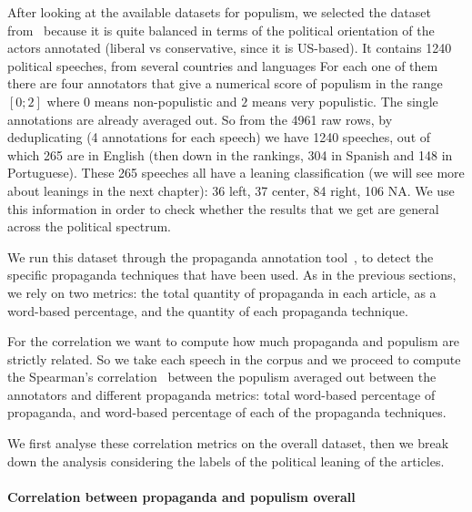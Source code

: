 After looking at the available datasets for populism, we selected the dataset from~\citet{hawkins2019global} because it is quite balanced in terms of the political orientation of the actors annotated (liberal vs conservative, since it is US-based).%
It contains 1240 political speeches, from several countries and languages
For each one of them there are four annotators that give a numerical score of populism in the range $[0;2]$ where $0$ means non-populistic and $2$ means very populistic. The single annotations are already averaged out.
So from the 4961 raw rows, by deduplicating (4 annotations for each speech) we have 1240 speeches, out of which 265 are in English (then down in the rankings, 304 in Spanish and 148 in Portuguese).
These 265 speeches all have a leaning classification (we will see more about leanings in the next chapter): 36 left, 37 center, 84 right, 106 NA. We use this information in order to check whether the results that we get are general across the political spectrum.

We run this dataset through the propaganda annotation tool~\citep{da2019fine}, to detect the specific propaganda techniques that have been used.
As in the previous sections, we rely on two metrics: the total quantity of propaganda in each article, as a word-based percentage, and the quantity of each propaganda technique. %

For the correlation we want to compute how much propaganda and populism are strictly related. So we take each speech in the corpus and we proceed to compute the Spearman's correlation~\citep{spearman1910correlation} between the  populism averaged out between the annotators and different propaganda metrics: total word-based percentage of propaganda, and word-based percentage of each of the propaganda techniques. 

We first analyse these correlation metrics on the overall dataset, then we break down the analysis considering the labels of the political leaning of the articles.


\paragraph{Correlation between propaganda and populism overall}

